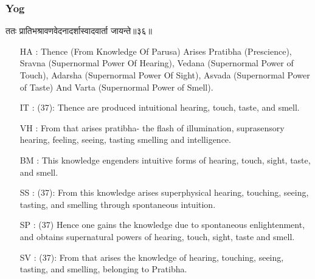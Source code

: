 \begin{frame}[fragile]\frametitle{Yog}
\begin{sanskrit}
ततः प्रातिभश्रावणवेदनादर्शास्वादवार्ता जायन्ते॥३६॥
\end{sanskrit}

	\begin{itemize}
	\item [HA]: Thence (From Knowledge Of Parusa) Arises Pratibha (Prescience), Sravna (Supernormal Power Of Hearing), Vedana (Supernormal Power of Touch), Adarsha (Supernormal Power Of Sight), Asvada (Supernormal Power of Taste) And Varta (Supernormal Power of Smell).
	\item [IT]: (37): Thence are produced intuitional hearing, touch, taste, and smell.
	\item [VH]: From that arises pratibha- the flash of illumination, suprasensory hearing, feeling, seeing, tasting smelling and intelligence.
	\item [BM]: This knowledge engenders intuitive forms of hearing, touch, sight, taste, and smell.
	\item [SS]: (37): From this knowledge arises superphysical hearing, touching, seeing, tasting, and smelling through spontaneous intuition.
	\item [SP]: (37) Hence one gains the knowledge due to spontaneous enlightenment, and obtains supernatural powers of hearing, touch, sight, taste and smell.
	\item [SV]: (37): From that arises the knowledge of hearing, touching, seeing, tasting, and smelling, belonging to Pratibha. 
	\end{itemize}
\end{frame}

